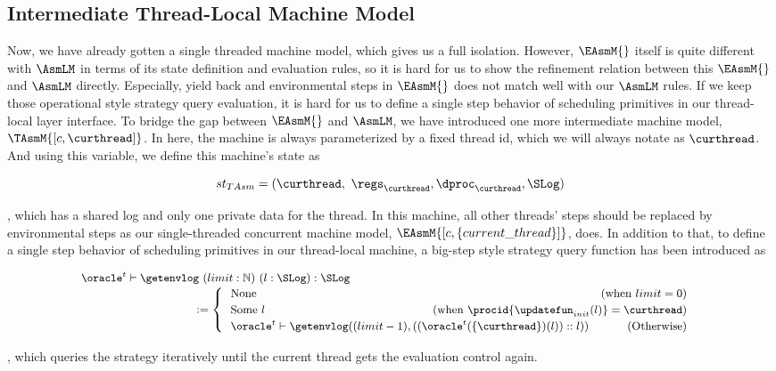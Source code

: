 \subsection{Intermediate Thread-Local Machine Model}\label{subsec:tasm}

Now, we have already gotten a single threaded machine model, which gives us a full isolation.
However, $\EAsmM{}$ itself is quite different with $\AsmLM$ in terms of its state definition and evaluation rules,
so it is hard for us to show the refinement relation between this $\EAsmM{}$ and $\AsmLM$ directly. 
Especially, yield back and environmental steps in $\EAsmM{}$ does not match well with our $\AsmLM$ rules. 
If we keep those operational style strategy query evaluation, it is hard for us to define a single step behavior of 
scheduling primitives in our thread-local layer interface.
To bridge the gap between $\EAsmM{}$ and $\AsmLM$,
we have introduced one more intermediate machine model, $\TAsmM{[c, \curthread]}$. 
In here, the machine is always parameterized by a fixed thread id, which we will always notate as $\curthread$. 
And using this variable, we define this machine's state as
\begin{small}
\[
st_{TAsm} = (\curthread, \ \regs_{\curthread}, \dproc_{\curthread}, \SLog) 
\]
\end{small}
, which has a shared log and only one private data for the thread.
In this machine, all other threads' steps should be replaced by environmental steps
as our single-threaded concurrent machine model, $\EAsmM{[c, \{current\_thread\}]}$, does.
In addition to that, to define a single step behavior of scheduling primitives in our thread-local machine, a big-step style strategy query function has 
been introduced as
\begin{small}
\[{\small
\begin{array}{l}
\oracle^{t} \vdash \getenvlog\ (limit :\mathbb{N})\ (l: \SLog ):  \SLog  \\
\ \ \ \ \ \ \ \ \ \ \ \ \ \ \ \ \ \ \ \ \ \ \ \ \ \ \ \ \ \ :=
\begin{cases}
\ \ \mathrm{None}\hfill (\mathrm{when} \ limit = 0) \\
\ \ \mathrm{Some} \ l \hfill (\mathrm{when} \ \procid{\updatefun_{init}(l)} = \curthread) \\
\ \ \oracle^{t} \vdash \getenvlog((limit - 1), ((\oracle^{t}(\{\curthread\})(l))::l))\ \ \ \ \  \ \ \ \ \ 
\hfill (\mathrm{Otherwise})\\
\end{cases} 
\end{array}
}\]
\end{small}
, which queries the strategy iteratively until the current thread gets the evaluation control again.

